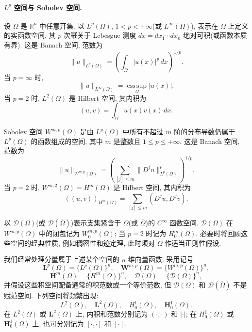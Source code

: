 \paragraph{$L^p$ 空间与 Sobolev 空间.}
设 $\Omega$ 是 $\mathbb{R}^n$ 中任意开集. 以 $L^p(\Omega)$, $1<p<+\infty$(或 $L^\infty(\Omega)$), 表示在 $\Omega$ 上定义的实函数空间, 其 $p$ 次幂关于 Lebesgue 测度 $dx=dx_1\cdots dx_n$ 绝对可积(或函数本质有界). 这是 Banach 空间, 范数为
\begin{equation}
\lVert u\rVert_{L^p(\Omega)}
=\left(\int_\Omega\lvert u(x)\rvert^p\,dx\right)^{1/p}.
\label{eq:ch1-lp-norm}
\end{equation}
当 $p=\infty$ 时,
\[
\lVert u\rVert_{L^\infty(\Omega)}=\operatorname*{ess\,sup}_\Omega\lvert u(x)\rvert.
\]
当 $p=2$ 时, $L^2(\Omega)$ 是 Hilbert 空间, 其内积为
\begin{equation}
(u,v)=\int_\Omega u(x)v(x)\,dx.
\label{eq:ch1-l2-inner-product}
\end{equation}

Sobolev 空间 $W^{m,p}(\Omega)$ 是由 $L^p(\Omega)$ 中所有不超过 $m$ 阶的分布导数仍属于 $L^p(\Omega)$ 的函数组成的空间, 其中 $m$ 是整数且 $1\leq p\leq+\infty$. 这是 Banach 空间, 范数为
\begin{equation}
\lVert u\rVert_{W^{m,p}(\Omega)}
=\left(\sum_{[j]\leq m}\lVert D^ju\rVert_{L^p(\Omega)}^p\right)^{1/p}.
\label{eq:ch1-sobolev-norm}
\end{equation}
当 $p=2$ 时, $W^{m,2}(\Omega)=H^m(\Omega)$ 是 Hilbert 空间, 其内积为
\begin{equation}
((u,v))_{H^m(\Omega)}=\sum_{[j]\leq m}(D^ju,D^jv).
\label{eq:ch1-sobolev-inner-product}
\end{equation}

以 $\mathcal{D}(\Omega)$(或 $\mathcal{D}(\overline\Omega)$)表示支集紧含于 $\Omega$(或 $\overline\Omega$)的 $C^\infty$ 函数空间. $\mathcal{D}(\Omega)$ 在 $W^{m,p}(\Omega)$ 中的闭包记为 $W_0^{m,p}(\Omega)$; 当 $p=2$ 时记为 $H_0^m(\Omega)$. 必要时将回顾这些空间的经典性质, 例如稠密性和迹定理, 此时须对 $\Omega$ 作适当正则性假设.

我们经常处理分量属于上述某个空间的 $n$ 维向量函数. 采用记号
\[
\mathbf{L}^p(\Omega)=\{L^p(\Omega)\}^n,\quad
\mathbf{W}^{m,p}(\Omega)=\{W^{m,p}(\Omega)\}^n,
\]
\[
\mathbf{H}^m(\Omega)=\{H^m(\Omega)\}^n,\quad
\mathbf{\mathcal D}(\Omega)=\{\mathcal D(\Omega)\}^n,
\]
并假设这些积空间配备通常的积范数或一个等价范数, 但 $\mathcal D(\Omega)$ 和 $\mathcal D(\overline\Omega)$ 不是赋范空间. 下列空间将频繁出现:
\[
L^2(\Omega),\quad\mathbf L^2(\Omega),\quad H_0^1(\Omega),\quad\mathbf H_0^1(\Omega).
\]
在 $L^2(\Omega)$ 或 $\mathbf L^2(\Omega)$ 上, 内积和范数分别记为 $(\cdot,\cdot)$ 和 $\lvert\cdot\rvert$; 在 $H_0^1(\Omega)$ 或 $\mathbf H_0^1(\Omega)$ 上, 也可分别记为 $[\cdot,\cdot]$ 和 $[\cdot]$.

